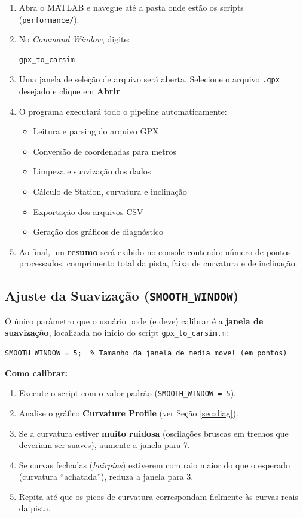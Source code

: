 \documentclass[a4paper,12pt]{article}
\begin{document}
\begin{enumerate}
    \item Abra o MATLAB e navegue até a pasta onde estão os scripts (\texttt{performance/}).
    \item No \textit{Command Window}, digite:
    \begin{lstlisting}[style=matlabstyle]
gpx_to_carsim
    \end{lstlisting}
    \item Uma janela de seleção de arquivo será aberta. Selecione o arquivo \texttt{.gpx} desejado e clique em \textbf{Abrir}.
    \item O programa executará todo o pipeline automaticamente:
    \begin{itemize}
        \item Leitura e parsing do arquivo GPX
        \item Conversão de coordenadas para metros
        \item Limpeza e suavização dos dados
        \item Cálculo de Station, curvatura e inclinação
        \item Exportação dos arquivos CSV
        \item Geração dos gráficos de diagnóstico
    \end{itemize}
    \item Ao final, um \textbf{resumo} será exibido no console contendo: número de pontos processados, comprimento total da pista, faixa de curvatura e de inclinação.
\end{enumerate}

\subsection{Ajuste da Suavização (\texttt{SMOOTH\_WINDOW})}
\label{sec:smooth}

O único parâmetro que o usuário pode (e deve) calibrar é a \textbf{janela de suavização}, localizada no início do script \texttt{gpx\_to\_carsim.m}:

\begin{lstlisting}[style=matlabstyle]
SMOOTH_WINDOW = 5;  % Tamanho da janela de media movel (em pontos)
\end{lstlisting}

\textbf{Como calibrar:}

\begin{enumerate}
    \item Execute o script com o valor padrão (\texttt{SMOOTH\_WINDOW = 5}).
    \item Analise o gráfico \textbf{Curvature Profile} (ver Seção \ref{sec:diag}).
    \item Se a curvatura estiver \textbf{muito ruidosa} (oscilações bruscas em trechos que deveriam ser suaves), aumente a janela para 7.
    \item Se curvas fechadas (\textit{hairpins}) estiverem com raio maior do que o esperado (curvatura ``achatada''), reduza a janela para 3.
    \item Repita até que os picos de curvatura correspondam fielmente às curvas reais da pista.
\end{enumerate}
\end{document}
